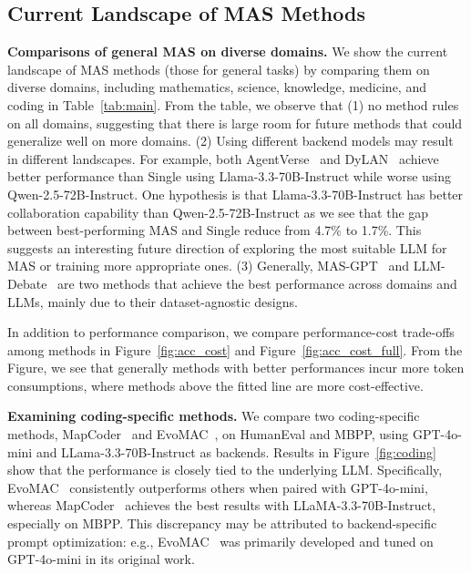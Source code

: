 \documentclass{article}
\begin{document}
\subsection{Current Landscape of MAS Methods}

\textbf{Comparisons of general MAS on diverse domains.}
We show the current landscape of MAS methods (those for general tasks) by comparing them on diverse domains, including mathematics, science, knowledge, medicine, and coding in Table~\ref{tab:main}.
From the table, we observe that 
(1) no method rules on all domains, suggesting that there is large room for future methods that could generalize well on more domains.
(2) Using different backend models may result in different landscapes.
For example, both AgentVerse~\cite{chen2023agentverse} and DyLAN~\cite{dylan} achieve better performance than Single using Llama-3.3-70B-Instruct while worse using Qwen-2.5-72B-Instruct.
One hypothesis is that Llama-3.3-70B-Instruct has better collaboration capability than Qwen-2.5-72B-Instruct as we see that the gap between best-performing MAS and Single reduce from 4.7\% to 1.7\%.
This suggests an interesting future direction of exploring the most suitable LLM for MAS or training more appropriate ones.
(3) Generally, MAS-GPT~\cite{masgpt} and LLM-Debate~\cite{debate1} are two methods that achieve the best performance across domains and LLMs, mainly due to their dataset-agnostic designs.

In addition to performance comparison, we compare performance-cost trade-offs among methods in Figure~\ref{fig:acc_cost} and Figure~\ref{fig:acc_cost_full}.
From the Figure, we see that generally methods with better performances incur more token consumptions, where methods above the fitted line are more cost-effective.

\textbf{Examining coding-specific methods.}
We compare two coding-specific methods, MapCoder~\cite{islam2024mapcoder} and EvoMAC~\cite{hu2025selfevolving}, on HumanEval and MBPP, using GPT-4o-mini and LLama-3.3-70B-Instruct as backends.
Results in Figure~\ref{fig:coding} show that the performance is closely tied to the underlying LLM.
Specifically, EvoMAC~\cite{hu2025selfevolving} consistently outperforms others when paired with GPT-4o-mini, whereas MapCoder~\cite{islam2024mapcoder} achieves the best results with LLaMA-3.3-70B-Instruct, especially on MBPP.
This discrepancy may be attributed to backend-specific prompt optimization: e.g., EvoMAC~\cite{hu2025selfevolving} was primarily developed and tuned on GPT-4o-mini in its original work.
\end{document}
